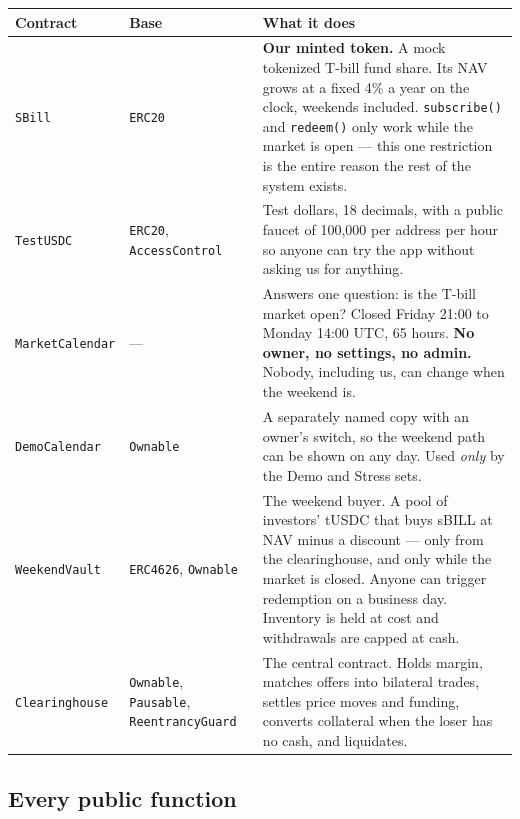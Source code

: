 \documentclass[11pt,a4paper]{article}
\begin{document}
\begin{center}
\small
\begin{tabular}{@{}p{2.8cm}p{2.7cm}p{9.9cm}@{}}
\toprule
\textbf{Contract} & \textbf{Base} & \textbf{What it does} \\
\midrule
\texttt{SBill} & \texttt{ERC20} &
\textbf{Our minted token.} A mock tokenized T-bill fund share. Its NAV grows at a fixed 4\% a year on
the clock, weekends included. \texttt{subscribe()} and \texttt{redeem()} only work while the market is
open — this one restriction is the entire reason the rest of the system exists. \\

\texttt{TestUSDC} & \texttt{ERC20}, \texttt{AccessControl} &
Test dollars, 18 decimals, with a public faucet of 100,000 per address per hour so anyone can try the
app without asking us for anything. \\

\texttt{MarketCalendar} & --- &
Answers one question: is the T-bill market open? Closed Friday 21:00 to Monday 14:00 UTC, 65 hours.
\textbf{No owner, no settings, no admin.} Nobody, including us, can change when the weekend is. \\

\texttt{DemoCalendar} & \texttt{Ownable} &
A separately named copy with an owner's switch, so the weekend path can be shown on any day. Used
\emph{only} by the Demo and Stress sets. \\

\texttt{WeekendVault} & \texttt{ERC4626}, \texttt{Ownable} &
The weekend buyer. A pool of investors' tUSDC that buys sBILL at NAV minus a discount — only from the
clearinghouse, and only while the market is closed. Anyone can trigger redemption on a business day.
Inventory is held at cost and withdrawals are capped at cash. \\

\texttt{Clearinghouse} & \texttt{Ownable}, \texttt{Pausable}, \texttt{ReentrancyGuard} &
The central contract. Holds margin, matches offers into bilateral trades, settles price moves and funding,
converts collateral when the loser has no cash, and liquidates. \\
\bottomrule
\end{tabular}
\end{center}

\subsection{Every public function}
\end{document}

